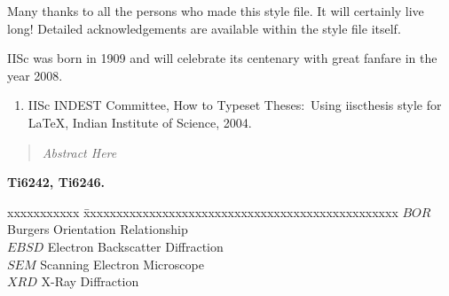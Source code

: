 \begin{frontmatter}
Many thanks to all the persons who made this style file. It will certainly
live long! Detailed acknowledgements are available within the style file itself.

\vita
IISc was born in 1909 and will celebrate its centenary with great fanfare
in the year 2008.
\publications

\begin{enumerate}
\item IISc INDEST Committee,  How to Typeset Theses:~Using iiscthesis
style for \LaTeX, Indian Institute of Science, 2004.
\end{enumerate}

\begin{abstract}
\sl
Abstract Here
	
\end{abstract}



\makecontents

\keywords
{\large\bf{
Ti6242, Ti6246.
}}

\vspace{10MM}
\notations
\begin{singlespace}
\begin{tabbing}
xxxxxxxxxxx \= xxxxxxxxxxxxxxxxxxxxxxxxxxxxxxxxxxxxxxxxxxxxxxxx \kill
\textbf{$BOR$}   \> Burgers Orientation Relationship \\
\textbf{$EBSD$}  \> Electron Backscatter Diffraction  \\
\textbf{$SEM$}   \> Scanning Electron Microscope \\
\textbf{$XRD$}   \> X-Ray Diffraction \\
\end{tabbing}
\end{singlespace}
\end{frontmatter}
